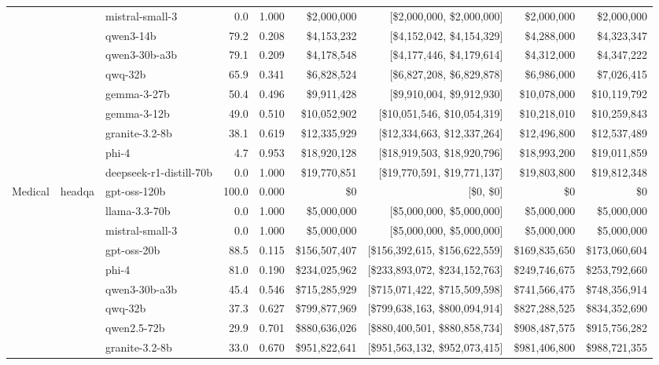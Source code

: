 \begin{table}[t]
\begin{tabular}{lllrrrrrr}
   &  & mistral-small-3 & 0.0 & 1.000 & \$2,000,000 & [\$2,000,000, \$2,000,000] & \$2,000,000 & \$2,000,000 \\
   &  & qwen3-14b & 79.2 & 0.208 & \$4,153,232 & [\$4,152,042, \$4,154,329] & \$4,288,000 & \$4,323,347 \\
   &  & qwen3-30b-a3b & 79.1 & 0.209 & \$4,178,548 & [\$4,177,446, \$4,179,614] & \$4,312,000 & \$4,347,222 \\
   &  & qwq-32b & 65.9 & 0.341 & \$6,828,524 & [\$6,827,208, \$6,829,878] & \$6,986,000 & \$7,026,415 \\
   &  & gemma-3-27b & 50.4 & 0.496 & \$9,911,428 & [\$9,910,004, \$9,912,930] & \$10,078,000 & \$10,119,792 \\
   &  & gemma-3-12b & 49.0 & 0.510 & \$10,052,902 & [\$10,051,546, \$10,054,319] & \$10,218,010 & \$10,259,843 \\
   &  & granite-3.2-8b & 38.1 & 0.619 & \$12,335,929 & [\$12,334,663, \$12,337,264] & \$12,496,800 & \$12,537,489 \\
   &  & phi-4 & 4.7 & 0.953 & \$18,920,128 & [\$18,919,503, \$18,920,796] & \$18,993,200 & \$19,011,859 \\
   &  & deepseek-r1-distill-70b & 0.0 & 1.000 & \$19,770,851 & [\$19,770,591, \$19,771,137] & \$19,803,800 & \$19,812,348 \\
\midrule
  Medical & headqa & gpt-oss-120b & 100.0 & 0.000 & \$0 & [\$0, \$0] & \$0 & \$0 \\
   &  & llama-3.3-70b & 0.0 & 1.000 & \$5,000,000 & [\$5,000,000, \$5,000,000] & \$5,000,000 & \$5,000,000 \\
   &  & mistral-small-3 & 0.0 & 1.000 & \$5,000,000 & [\$5,000,000, \$5,000,000] & \$5,000,000 & \$5,000,000 \\
   &  & gpt-oss-20b & 88.5 & 0.115 & \$156,507,407 & [\$156,392,615, \$156,622,559] & \$169,835,650 & \$173,060,604 \\
   &  & phi-4 & 81.0 & 0.190 & \$234,025,962 & [\$233,893,072, \$234,152,763] & \$249,746,675 & \$253,792,660 \\
   &  & qwen3-30b-a3b & 45.4 & 0.546 & \$715,285,929 & [\$715,071,422, \$715,509,598] & \$741,566,475 & \$748,356,914 \\
   &  & qwq-32b & 37.3 & 0.627 & \$799,877,969 & [\$799,638,163, \$800,094,914] & \$827,288,525 & \$834,352,690 \\
   &  & qwen2.5-72b & 29.9 & 0.701 & \$880,636,026 & [\$880,400,501, \$880,858,734] & \$908,487,575 & \$915,756,282 \\
   &  & granite-3.2-8b & 33.0 & 0.670 & \$951,822,641 & [\$951,563,132, \$952,073,415] & \$981,406,800 & \$988,721,355 \\

\end{tabular}
\end{table}
